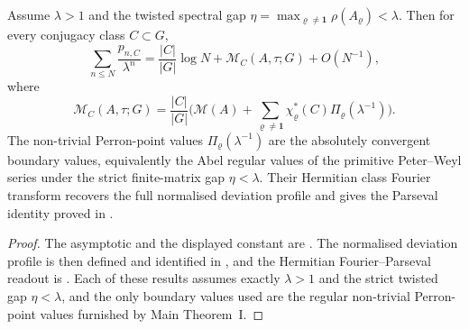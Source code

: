 \begin{theorem}
  \label{stmt:main-theorem-ii-class-mertens-constants}
  \label{thm:intro-class-mertens-constants}
  \label{thm:intro-class-mertens}
  Assume \(\lambda>1\) and the twisted spectral gap
  \(\eta=\max_{\varrho\neq\mathbf1}\rho(A_\varrho)<\lambda\).  Then for
  every conjugacy class \(C\subset G\),
  \[
    \sum_{n\le N}\frac{p_{n,C}}{\lambda^n}
    =
    \frac{|C|}{|G|}\log N+\mathcal M_C(A,\tau;G)+O(N^{-1}),
  \]
  where
  \[
    \mathcal M_C(A,\tau;G)=
    \frac{|C|}{|G|}\biggl(\mathcal M(A)+
      \sum_{\varrho\neq\mathbf1}\chi_\varrho^\ast(C)
        \Pi_\varrho(\lambda^{-1})\biggr).
  \]
  The non-trivial Perron-point values
  \(\Pi_\varrho(\lambda^{-1})\) are the absolutely convergent boundary
  values, equivalently the Abel regular values of the primitive
  Peter--Weyl series under the strict finite-matrix gap
  \(\eta<\lambda\).  Their Hermitian class Fourier transform recovers the full
  normalised deviation profile and gives the Parseval identity proved in
  .
\end{theorem}
\begin{proof}
  The asymptotic and the displayed constant are
  .  The normalised deviation profile is then
  defined and identified in , and the
  Hermitian Fourier--Parseval readout is .
  Each of these results assumes exactly \(\lambda>1\) and the strict twisted
  gap \(\eta<\lambda\), and the only boundary values used are the regular
  non-trivial Perron-point values furnished by Main Theorem~I.
\end{proof}

